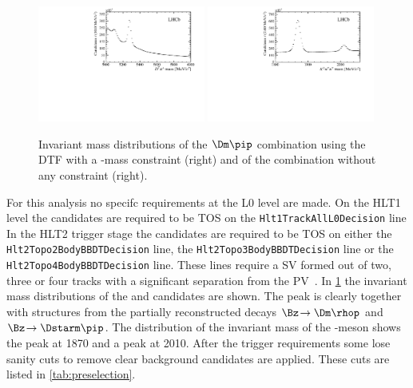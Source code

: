 \begin{figure}[tbp]
    \centering
    \includegraphics[width=0.49\textwidth]{06selection/figs/Bmass_afterStrippingAndTrigger.pdf}
    \includegraphics[width=0.49\textwidth]{06selection/figs/Dmass_afterStrippingAndTrigger.pdf}
    \caption{Invariant mass distributions of the $\Dm\pip$ combination using the DTF with a \Dm-mass constraint (right) and of the \Kp\pim\pim combination without any constraint (right).}
    \label{fig:BAndDmassAfterStripping}
\end{figure}
For this analysis no specifc requirements at the L0 level are made.
On the HLT1 level the \Bz candidates are required to be TOS on the \verb!Hlt1TrackAllL0Decision! line
In the HLT2 trigger stage the \BdToDpi candidates are required to be TOS on either the \verb!Hlt2Topo2BodyBBDTDecision! line, the \verb!Hlt2Topo3BodyBBDTDecision! line  or the \verb!Hlt2Topo4BodyBBDTDecision! line.
These lines require a \ac{SV} formed out of two, three or four tracks with a significant separation from the \ac{PV}~\cite{Trigger_Gligorov}.
In \cref{fig:BAndDmassAfterStripping} the invariant mass distributions of the \Bz and \Dm candidates are shown. The \Bz peak is clearly together with structures from the partially reconstructed decays $\Bz\!\to\Dm\rhop$ and $\Bz\!\to\Dstarm\pip$.
The distribution of the invariant mass of the \D-meson shows the \Dm peak at \SI[per-mode=symbol]{1870}{\MeVcc} and a \Dstarm peak at \SI[per-mode=symbol]{2010}{\MeVcc}.
After the trigger requirements some lose sanity cuts to remove clear background candidates are applied.
These cuts are listed in \cref{tab:preselection}.
